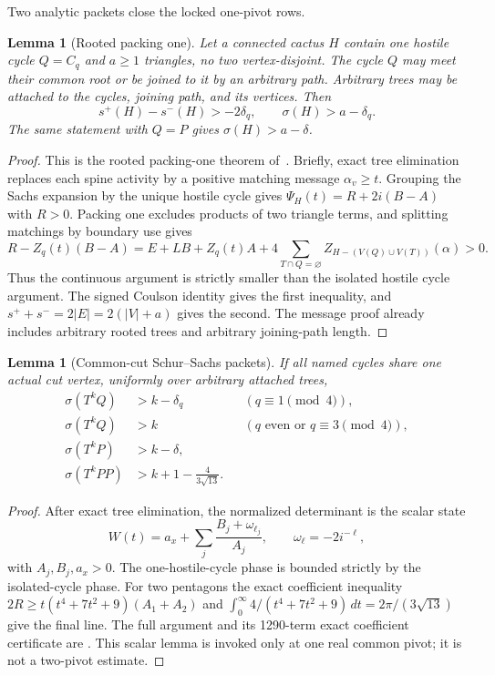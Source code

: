 \documentclass[11pt]{article}
\newtheorem{lemma}[theorem]{Lemma}
\newcommand{\spE}{s^+}
\newcommand{\smE}{s^-}
\newcommand{\sig}{\sigma}
\begin{document}
Two analytic packets close the locked one-pivot rows.

\begin{lemma}[Rooted packing one]\label{lem:packing}
Let a connected cactus $H$ contain one hostile cycle $Q=C_q$ and $a\geq1$
triangles, no two vertex-disjoint.  The cycle $Q$ may meet their common root or
be joined to it by an arbitrary path.  Arbitrary trees may be attached to the
cycles, joining path, and its vertices.  Then
\[
 \spE(H)-\smE(H)>-2\delta_q,
 \qquad \sig(H)>a-\delta_q.
\]
The same statement with $Q=P$ gives $\sig(H)>a-\delta$.
\end{lemma}

\begin{proof}
This is the rooted packing-one theorem of~\cite{PackingOne}.  Briefly, exact
tree elimination replaces each spine activity by a positive matching message
$\alpha_v\geq t$.  Grouping the Sachs expansion by the unique hostile cycle
gives $\Psi_H(t)=R+2i(B-A)$ with $R>0$.  Packing one excludes products of two
triangle terms, and splitting matchings by boundary use gives
\[
 R-Z_q(t)(B-A)=E+LB+Z_q(t)A+
 4\sum_{T\cap Q=\varnothing}Z_{H-(V(Q)\cup V(T))}(\alpha)>0.
\]
Thus the continuous argument is strictly smaller than the isolated hostile
cycle argument.  The signed Coulson identity gives the first inequality, and
$\spE+\smE=2|E|=2(|V|+a)$ gives the second.  The message proof already includes
arbitrary rooted trees and arbitrary joining-path length.
\end{proof}

\begin{lemma}[Common-cut Schur--Sachs packets]\label{lem:common}
If all named cycles share one actual cut vertex, uniformly over arbitrary
attached trees,
\begin{align}
 \sig(T^kQ)&>k-\delta_q &&(q\equiv1\pmod4),\label{eq:ccq}\\
 \sig(T^kQ)&>k &&(q\text{ even or }q\equiv3\pmod4),\label{eq:ccgood}\\
 \sig(T^kP)&>k-\delta,\label{eq:ccp}\\
 \sig(T^kPP)&>k+1-\frac4{3\sqrt{13}}.\label{eq:ccpp}
\end{align}
\end{lemma}

\begin{proof}
After exact tree elimination, the normalized determinant is the scalar state
\[
 W(t)=a_x+\sum_j\frac{B_j+\omega_{\ell_j}}{A_j},
 \qquad \omega_\ell=-2i^{-\ell},
\]
with $A_j,B_j,a_x>0$.  The one-hostile-cycle phase is bounded strictly by the
isolated-cycle phase.  For two pentagons the exact coefficient inequality
$2R\geq t(t^4+7t^2+9)(A_1+A_2)$ and
$\int_0^\infty4/(t^4+7t^2+9)\,dt=2\pi/(3\sqrt{13})$ give the final line.
The full argument and its 1290-term exact coefficient certificate are
\cite{CommonCut,Coefficient}.  This scalar lemma is invoked only at one real
common pivot; it is not a two-pivot estimate.
\end{proof}
\end{document}
